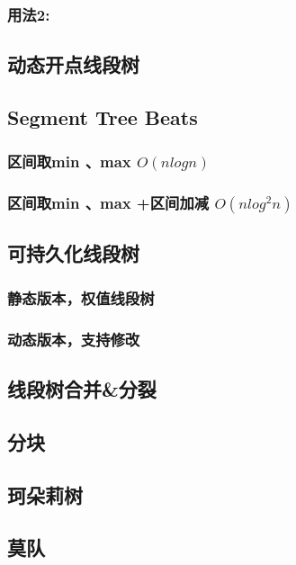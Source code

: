 \documentclass[twocolumn,a4paper]{article}  %
\begin{document}
\subsubsection{用法2:}

\subsection{动态开点线段树}

\subsection{Segment Tree Beats}
\subsubsection{区间取min 、max  $O(nlogn)$}

\subsubsection{区间取min 、max +区间加减 $O(nlog^2n)$}

\subsection{可持久化线段树}
\subsubsection{静态版本，权值线段树}

\subsubsection{动态版本，支持修改}

\subsection{线段树合并\&分裂}

\subsection{分块}

\subsection{珂朵莉树}

\subsection{莫队}
\end{document}
